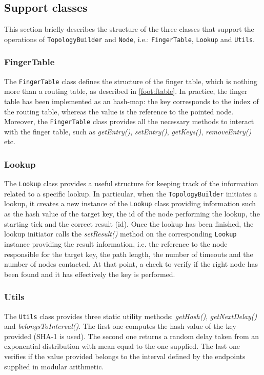 \documentclass[11pt,twocolumn,letterpaper]{article}
\begin{document}
	\subsection{Support classes}
	\label{subsec:support-classes}
	This section briefly describes the structure of the three classes that support the operations of \texttt{TopologyBuilder} and \texttt{Node}, i.e.: \texttt{FingerTable}, \texttt{Lookup} and \texttt{Utils}.
	
	\subsubsection{FingerTable}
	\label{subsubsec:finger-table}
	The \texttt{FingerTable} class defines the structure of the finger table, which is nothing more than a routing table, as described in \cref{foot:ftable}. In practice, the finger table has been implemented as an hash-map: the key corresponds to the index of the routing table, whereas the value is the reference to the pointed node. Moreover, the \texttt{FingerTable} class provides all the necessary methods to interact with the finger table, such as \textit{getEntry()}, \textit{setEntry()}, \textit{getKeys()}, \textit{removeEntry()} etc.
	
	\subsubsection{Lookup}
	\label{subsubsec:lookup-class}
	The \texttt{Lookup} class provides a useful structure for keeping track of the information related to a specific lookup. \newline
	In particular, when the \texttt{TopologyBuilder} initiates a lookup, it creates a new instance of the \texttt{Lookup} class providing information such as the hash value of the target key, the id of the node performing the lookup, the starting tick and the correct result (id). \newline
	Once the lookup has been finished, the lookup initiator calls the \textit{setResult()} method on the corresponding \texttt{Lookup} instance providing the result information, i.e. the reference to the node responsible for the target key, the path length, the number of timeouts and the number of nodes contacted. At that point, a check to verify if the right node has been found and it has effectively the key is performed.
	
	\subsubsection{Utils}
	\label{subsubsec:utils}
	The \texttt{Utils} class provides three static utility methods: \textit{getHash()}, \textit{getNextDelay()} and \textit{belongsToInterval()}. \newline
	The first one computes the hash value of the key provided (SHA-1 is used). The second one returns a random delay taken from an exponential distribution with mean equal to the one supplied. The last one verifies if the value provided belongs to the interval defined by the endpoints supplied in modular arithmetic.
	
\end{document}
